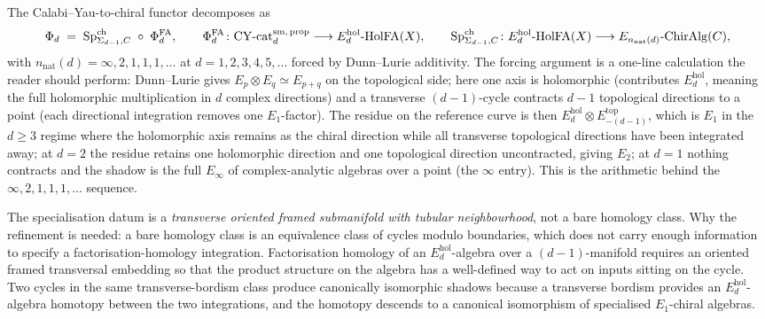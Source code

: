 \begin{theorem}
\label{wn:thm:spine-two-stage}
The Calabi--Yau-to-chiral functor decomposes as
\[
\Phi_d \;=\; \mathrm{Sp}^{\mathrm{ch}}_{\Sigma_{d-1}, C} \;\circ\;
\Phi^{\mathrm{FA}}_d,\qquad
\Phi^{\mathrm{FA}}_d \colon \mathrm{CY}\text{-cat}_d^{\mathrm{sm,\,prop}} \longrightarrow
E_d^{\mathrm{hol}}\text{-}\mathrm{HolFA}(X),\qquad
\mathrm{Sp}^{\mathrm{ch}}_{\Sigma_{d-1}, C} \colon
E_d^{\mathrm{hol}}\text{-}\mathrm{HolFA}(X) \longrightarrow
E_{n_{\mathrm{nat}}(d)}\text{-}\mathrm{ChirAlg}(C),
\]
with $n_{\mathrm{nat}}(d) = \infty, 2, 1, 1, 1, \dots$ at
$d = 1, 2, 3, 4, 5, \dots$ forced by Dunn--Lurie additivity. The
forcing argument is a one-line calculation the reader should perform:
Dunn--Lurie gives $E_p \otimes E_q \simeq E_{p+q}$ on the topological
side; here one axis is holomorphic (contributes $E_d^{\mathrm{hol}}$,
meaning the full holomorphic multiplication in $d$ complex directions)
and a transverse $(d-1)$-cycle contracts $d-1$ topological directions
to a point (each directional integration removes one $E_1$-factor).
The residue on the reference curve is then
$E_d^{\mathrm{hol}} \otimes E_{-(d-1)}^{\mathrm{top}}$, which is
$E_1$ in the $d\ge 3$ regime where the holomorphic axis remains as
the chiral direction while all transverse topological directions have
been integrated away; at $d=2$ the residue retains one holomorphic
direction and one topological direction uncontracted, giving $E_2$;
at $d=1$ nothing contracts and the shadow is the full $E_\infty$ of
complex-analytic algebras over a point (the $\infty$ entry). This is
the arithmetic behind the $\infty, 2, 1, 1, 1, \dots$ sequence.

The specialisation datum is a \emph{transverse oriented framed
submanifold with tubular neighbourhood}, not a bare homology class.
Why the refinement is needed: a bare homology class is an equivalence
class of cycles modulo boundaries, which does not carry enough
information to specify a factorisation-homology integration. Factorisation
homology of an $E_d^{\mathrm{hol}}$-algebra over a $(d-1)$-manifold
requires an oriented framed transversal embedding so that the product
structure on the algebra has a well-defined way to act on inputs
sitting on the cycle. Two cycles in the same transverse-bordism class
produce canonically isomorphic shadows because a transverse bordism
provides an $E_d^{\mathrm{hol}}$-algebra homotopy between the two
integrations, and the homotopy descends to a canonical isomorphism
of specialised $E_1$-chiral algebras.


\end{theorem}
